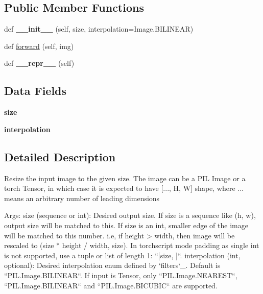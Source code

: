 \subsection*{Public Member Functions}
\begin{DoxyCompactItemize}
\item 
\mbox{\label{classtorchvision_1_1transforms_1_1transforms_1_1Resize_aa5f2054583e641c8dba397087b74833a}} 
def {\bfseries \+\_\+\+\_\+init\+\_\+\+\_\+} (self, size, interpolation=Image.\+B\+I\+L\+I\+N\+E\+AR)
\item 
def \hyperlink{classtorchvision_1_1transforms_1_1transforms_1_1Resize_ad5279678fd1ecb0279fda99391b93673}{forward} (self, img)
\item 
\mbox{\label{classtorchvision_1_1transforms_1_1transforms_1_1Resize_a37710e67345508df38bd09f58d843e7c}} 
def {\bfseries \+\_\+\+\_\+repr\+\_\+\+\_\+} (self)
\end{DoxyCompactItemize}
\subsection*{Data Fields}
\begin{DoxyCompactItemize}
\item 
\mbox{\label{classtorchvision_1_1transforms_1_1transforms_1_1Resize_add853490efa646b2a80356f91ef63475}} 
{\bfseries size}
\item 
\mbox{\label{classtorchvision_1_1transforms_1_1transforms_1_1Resize_ad365065471a22368ebb8523d53973c18}} 
{\bfseries interpolation}
\end{DoxyCompactItemize}


\subsection{Detailed Description}
\begin{DoxyVerb}Resize the input image to the given size.
The image can be a PIL Image or a torch Tensor, in which case it is expected
to have [..., H, W] shape, where ... means an arbitrary number of leading dimensions

Args:
    size (sequence or int): Desired output size. If size is a sequence like
        (h, w), output size will be matched to this. If size is an int,
        smaller edge of the image will be matched to this number.
        i.e, if height > width, then image will be rescaled to
        (size * height / width, size).
        In torchscript mode padding as single int is not supported, use a tuple or
        list of length 1: ``[size, ]``.
    interpolation (int, optional): Desired interpolation enum defined by `filters`_.
        Default is ``PIL.Image.BILINEAR``. If input is Tensor, only ``PIL.Image.NEAREST``, ``PIL.Image.BILINEAR``
        and ``PIL.Image.BICUBIC`` are supported.
\end{DoxyVerb}
 

